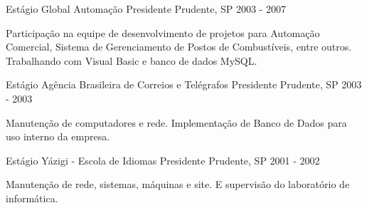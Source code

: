 \begin{cventries}
\cventry
{Estágio} %
{Global Automação} %
{Presidente Prudente, SP} %
{2003 - 2007} %
{
  \begin{cvitems} %
    \item {Participação na equipe de desenvolvimento de projetos para Automação Comercial, Sistema de Gerenciamento de Postos de Combustíveis, entre outros. Trabalhando com Visual Basic e banco de dados MySQL.}
  \end{cvitems}
}


\cventry
{Estágio} %
{Agência Brasileira de Correios e Telégrafos} %
{Presidente Prudente, SP} %
{2003 - 2003} %
{
  \begin{cvitems} %
    \item {Manutenção de computadores e rede. Implementação de Banco de Dados para uso interno da empresa.}
  \end{cvitems}
}


\cventry
{Estágio} %
{Yázigi - Escola de Idiomas} %
{Presidente Prudente, SP} %
{2001 - 2002} %
{
  \begin{cvitems} %
    \item {Manutenção de rede, sistemas, máquinas e site. E supervisão do laboratório de informática.}
  \end{cvitems}
}


\end{cventries}
